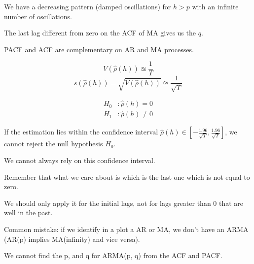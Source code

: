 We have a decreasing pattern (damped oscillations) for $h > p$ with
an infinite number of oscillations.

The last lag different from zero on the ACF of MA gives us the $q$.

PACF and ACF are complementary on AR and MA processes.

\begin{equation*}
	V(\hat \rho (h))  \approxeq \frac{1}{T}
\end{equation*}
\begin{equation*}
	s(\hat \rho (h))  = \sqrt{V(\hat \rho (h))} \approxeq \frac{1}{\sqrt{T}}
\end{equation*}

\begin{align*}
	H_0 & : \hat \rho (h) = 0    \\
	H_1 & : \hat \rho (h) \neq 0
\end{align*}

If the estimation lies within the confidence interval
$\hat \rho (h) \in \left[-\frac{1.96}{\sqrt{T}}, \frac{1.96}{\sqrt{T}}\right]$,
we cannot reject the null hypothesis $H_0$.

\begin{note}
	We cannot always rely on this confidence interval.

	Remember that what we care about is which is the last one which is not
	equal to zero.

	We should only apply it for the initial lags, not for lags greater
	than 0 that are well in the past.
\end{note}

\begin{marker}
	Common mistake: if we identify in a plot a AR or MA, we don't have an
	ARMA (AR(p) implies MA(infinity) and vice versa).

	We cannot find the p, and q for ARMA(p, q) from the ACF and PACF.
\end{marker}

